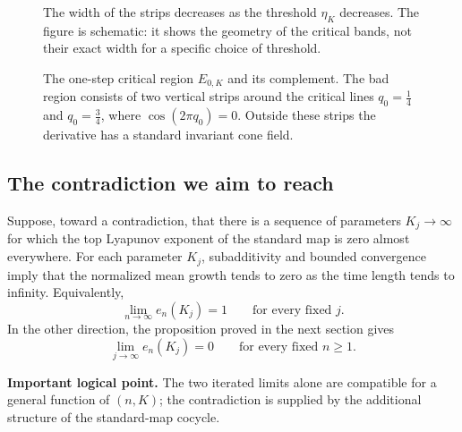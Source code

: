 \documentclass[11pt,a4paper]{article}
\begin{document}
\begin{figure}[htbp]
\begin{minipage}[c]{0.45\textwidth}
\medskip
\footnotesize The width of the strips decreases as the threshold $\eta_K$ decreases. The figure is schematic: it shows the geometry of the critical bands, not their exact width for a specific choice of threshold.
\end{minipage}
\caption{The one-step critical region $E_{0,K}$ and its complement. The bad region consists of two vertical strips around the critical lines $q_0=\tfrac14$ and $q_0=\tfrac34$, where $\cos(2\pi q_0)=0$. Outside these strips the derivative has a standard invariant cone field.}
\label{fig:E0K}
\end{figure}

\subsection*{The contradiction we aim to reach}
Suppose, toward a contradiction, that there is a sequence of parameters
$K_j\to\infty$ for which the top Lyapunov exponent of the standard map is
zero almost everywhere. For each parameter $K_j$, subadditivity and bounded
convergence imply that the normalized mean growth tends to zero as the time
length tends to infinity. Equivalently,
\begin{equation}\label{eq:long}
  \lim_{n\to\infty}e_n(K_j)=1\qquad\text{for every fixed }j.
\end{equation}
In the other direction, the proposition proved in the next section gives
\begin{equation}\label{eq:short}
  \lim_{j\to\infty}e_n(K_j)=0\qquad\text{for every fixed }n\ge1.
\end{equation}

\begin{center}
\setlength{\fboxsep}{9pt}%
\end{center}

\textbf{Important logical point.} The two iterated limits alone are
compatible for a general function of $(n,K)$; the contradiction is supplied
by the additional structure of the standard-map cocycle.
\end{document}
